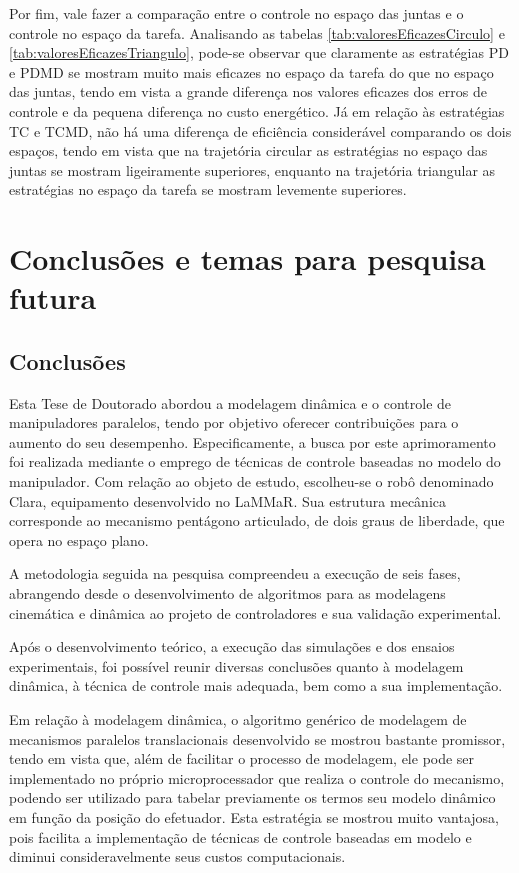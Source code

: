 \documentclass[]{politex}
\begin{document}
Por fim, vale fazer a comparação entre o controle no espaço das juntas e o controle no espaço da tarefa. Analisando as tabelas \ref{tab:valoresEficazesCirculo} e \ref{tab:valoresEficazesTriangulo}, pode-se observar que claramente as estratégias PD e PDMD se mostram muito mais eficazes no espaço da tarefa do que no espaço das juntas, tendo em vista a grande diferença nos valores eficazes dos erros de controle e da pequena diferença no custo energético. Já em relação às estratégias TC e TCMD, não há uma diferença de eficiência considerável comparando os dois espaços, tendo em vista que na trajetória circular as estratégias no espaço das juntas se mostram ligeiramente superiores, enquanto na trajetória triangular as estratégias no espaço da tarefa se mostram levemente superiores.




\chapter{Conclusões e temas para pesquisa futura}

\section{Conclusões}

Esta Tese de Doutorado abordou a modelagem dinâmica e o controle de manipuladores paralelos, tendo por objetivo oferecer contribuições para o aumento do seu desempenho. Especificamente, a busca por este aprimoramento foi realizada mediante o emprego de técnicas de controle baseadas no modelo do manipulador. Com relação ao objeto de estudo, escolheu-se o robô denominado Clara, equipamento desenvolvido no LaMMaR. Sua estrutura mecânica corresponde ao mecanismo pentágono articulado, de dois graus de liberdade, que opera no espaço plano. 

A metodologia seguida na pesquisa compreendeu a execução de seis fases, abrangendo desde o desenvolvimento de algoritmos para as modelagens cinemática e dinâmica ao projeto de controladores e sua validação experimental.

Após o desenvolvimento teórico, a execução das simulações e dos ensaios experimentais, foi possível reunir diversas conclusões quanto à modelagem dinâmica, à técnica de controle mais adequada, bem como a sua implementação.

Em relação à modelagem dinâmica, o algoritmo genérico de modelagem de mecanismos paralelos translacionais desenvolvido se mostrou bastante promissor, tendo em vista que, além de facilitar o processo de modelagem, ele pode ser implementado no próprio microprocessador que realiza o controle do mecanismo, podendo ser utilizado para tabelar previamente os termos seu modelo dinâmico em função da posição do efetuador. Esta estratégia se mostrou muito vantajosa, pois facilita a implementação de técnicas de controle baseadas em modelo e diminui consideravelmente seus custos computacionais.
\end{document}
